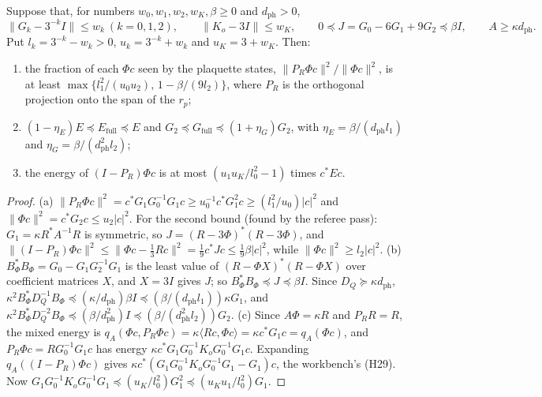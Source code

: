 \begin{proposition}\label{prop:relax}
Suppose that, for numbers $w_0,w_1,w_2,w_K,\beta\ge0$ and $d_{\mathrm{ph}}>0$,
\[
\|G_k-3^{-k}I\|\le w_k\ (k=0,1,2),\qquad\|K_o-3I\|\le w_K,\qquad 0\preceq J=G_0-6G_1+9G_2\preceq\beta I,\qquad A\ge\kappa d_{\mathrm{ph}}.
\]
Put $l_k=3^{-k}-w_k>0$, $u_k=3^{-k}+w_k$ and $u_K=3+w_K$. Then:
\begin{enumerate}[label=(\alph*)]
\item the fraction of each $\Phi c$ seen by the plaquette states, $\|P_R\Phi c\|^2/\|\Phi c\|^2$, is at least $\max\{l_1^2/(u_0u_2),\,1-\beta/(9l_2)\}$, where $P_R$ is the orthogonal projection onto the span of the $r_p$;
\item $(1-\eta_E)E\preceq E_{\mathrm{full}}\preceq E$ and $G_2\preceq G_{\mathrm{full}}\preceq(1+\eta_G)G_2$, with $\eta_E=\beta/(d_{\mathrm{ph}}l_1)$ and $\eta_G=\beta/(d_{\mathrm{ph}}^2l_2)$;
\item the energy of $(I-P_R)\Phi c$ is at most $(u_1u_K/l_0^2-1)$ times $c^*Ec$.
\end{enumerate}
\end{proposition}
\begin{proof}
(a) $\|P_R\Phi c\|^2=c^*G_1G_0^{-1}G_1c\ge u_0^{-1}c^*G_1^2c\ge(l_1^2/u_0)|c|^2$ and $\|\Phi c\|^2=c^*G_2c\le u_2|c|^2$. For the second bound (found by the referee pass): $G_1=\kappa R^*A^{-1}R$ is symmetric, so $J=(R-3\Phi)^*(R-3\Phi)$, and $\|(I-P_R)\Phi c\|^2\le\|\Phi c-\frac13Rc\|^2=\frac19c^*Jc\le\frac19\beta|c|^2$, while $\|\Phi c\|^2\ge l_2|c|^2$.
(b) $B_\Phi^*B_\Phi=G_0-G_1G_2^{-1}G_1$ is the least value of $(R-\Phi X)^*(R-\Phi X)$ over coefficient matrices $X$, and $X=3I$ gives $J$; so $B_\Phi^*B_\Phi\preceq J\preceq\beta I$. Since $D_Q\succeq\kappa d_{\mathrm{ph}}$, $\kappa^2B_\Phi^*D_Q^{-1}B_\Phi\preceq(\kappa/d_{\mathrm{ph}})\beta I\preceq(\beta/(d_{\mathrm{ph}}l_1))\kappa G_1$, and $\kappa^2B_\Phi^*D_Q^{-2}B_\Phi\preceq(\beta/d_{\mathrm{ph}}^2)I\preceq(\beta/(d_{\mathrm{ph}}^2l_2))G_2$.
(c) Since $A\Phi=\kappa R$ and $P_RR=R$, the mixed energy is $q_A(\Phi c,P_R\Phi c)=\kappa\langle Rc,\Phi c\rangle=\kappa c^*G_1c=q_A(\Phi c)$, and $P_R\Phi c=RG_0^{-1}G_1c$ has energy $\kappa c^*G_1G_0^{-1}K_oG_0^{-1}G_1c$. Expanding $q_A((I-P_R)\Phi c)$ gives $\kappa c^*(G_1G_0^{-1}K_oG_0^{-1}G_1-G_1)c$, the workbench's (H29). Now $G_1G_0^{-1}K_oG_0^{-1}G_1\preceq(u_K/l_0^2)G_1^2\preceq(u_Ku_1/l_0^2)G_1$.
\end{proof}

